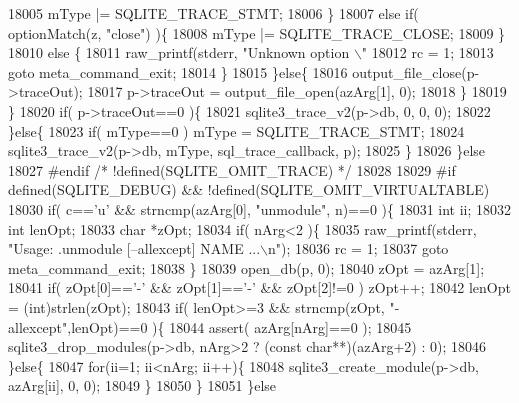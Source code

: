 \begin{DoxyCode}
{{{{{{{{{{{{{{{{{{{{{{{{{{{{{{{{{{{{{{{{{{{{{{{{{{{{{{{{{{{{{{{{{{{{{{{{{{{{{{{{{{{{{{{{{{{{{{{{{{{{{{{{{{{{{{{{{{{{{{{{{{{{{{{{{{{{{{{{{{{{{{{{{{{{18005           mType |= SQLITE_TRACE_STMT;
18006         \}
18007         \textcolor{keywordflow}{else} \textcolor{keywordflow}{if}( optionMatch(z, \textcolor{stringliteral}{"close"}) )\{
18008           mType |= SQLITE_TRACE_CLOSE;
18009         \}
18010         \textcolor{keywordflow}{else} \{
18011           raw_printf(stderr, \textcolor{stringliteral}{"Unknown option \(\backslash\)"%
18012           rc = 1;
18013           \textcolor{keywordflow}{goto} meta\_command\_exit;
18014         \}
18015       \}\textcolor{keywordflow}{else}\{
18016         output_file_close(p->traceOut);
18017         p->traceOut = output_file_open(azArg[1], 0);
18018       \}
18019     \}
18020     \textcolor{keywordflow}{if}( p->traceOut==0 )\{
18021       sqlite3_trace_v2(p->db, 0, 0, 0);
18022     \}\textcolor{keywordflow}{else}\{
18023       \textcolor{keywordflow}{if}( mType==0 ) mType = SQLITE_TRACE_STMT;
18024       sqlite3_trace_v2(p->db, mType, sql_trace_callback, p);
18025     \}
18026   \}\textcolor{keywordflow}{else}
18027 \textcolor{preprocessor}{#endif }\textcolor{comment}{/* !defined(SQLITE\_OMIT\_TRACE) */}\textcolor{preprocessor}{}
18028 
18029 \textcolor{preprocessor}{#if defined(SQLITE\_DEBUG) && !defined(SQLITE\_OMIT\_VIRTUALTABLE)}
18030   \textcolor{keywordflow}{if}( c==\textcolor{charliteral}{'u'} && strncmp(azArg[0], \textcolor{stringliteral}{"unmodule"}, n)==0 )\{
18031     \textcolor{keywordtype}{int} ii;
18032     \textcolor{keywordtype}{int} lenOpt;
18033     \textcolor{keywordtype}{char} *zOpt;
18034     \textcolor{keywordflow}{if}( nArg<2 )\{
18035       raw_printf(stderr, \textcolor{stringliteral}{"Usage: .unmodule [--allexcept] NAME ...\(\backslash\)n"});
18036       rc = 1;
18037       \textcolor{keywordflow}{goto} meta\_command\_exit;
18038     \}
18039     open_db(p, 0);
18040     zOpt = azArg[1];
18041     \textcolor{keywordflow}{if}( zOpt[0]==\textcolor{charliteral}{'-'} && zOpt[1]==\textcolor{charliteral}{'-'} && zOpt[2]!=0 ) zOpt++;
18042     lenOpt = (int)strlen(zOpt);
18043     \textcolor{keywordflow}{if}( lenOpt>=3 && strncmp(zOpt, \textcolor{stringliteral}{"-allexcept"},lenOpt)==0 )\{
18044       assert( azArg[nArg]==0 );
18045       sqlite3_drop_modules(p->db, nArg>2 ? (\textcolor{keyword}{const} \textcolor{keywordtype}{char}**)(azArg+2) : 0);
18046     \}\textcolor{keywordflow}{else}\{
18047       \textcolor{keywordflow}{for}(ii=1; ii<nArg; ii++)\{
18048         sqlite3_create_module(p->db, azArg[ii], 0, 0);
18049       \}
18050     \}
18051   \}\textcolor{keywordflow}{else}
}}}}}}}}}}}}}}}}}}}}}}}}}}}}}}}}}}}}}}}}}}}}}}}}}}}}}}}}}}}}}}}}}}}}}}}}}}}}}}}}}}}}}}}}}}}}}}}}}}}}}}}}}}}}}}}}}}}}}}}}}}}}}}}}}}}}}}}}}}}}}}}}}}}}}
\end{DoxyCode}
